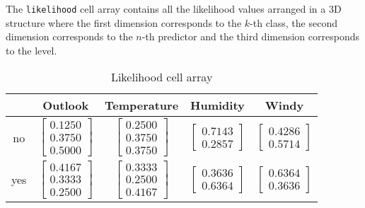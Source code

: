 The \texttt{likelihood} cell array contains all the likelihood values arranged in a 3D structure where the first dimension corresponds to the $k$-th class, the second dimension corresponds to the $n$-th predictor and the third dimension corresponds to the level.
\begin{table}[]
	\renewcommand{\arraystretch}{1.3}
	\caption{Likelihood cell array}
	\label{tbl:cond_probs_array}
	\centering
	\begin{tabular}{|c||c|c|c|c|}
		\hline
		& Outlook  & Temperature & Humidity & Windy \\ \hline \hline
		no  & $\begin{bmatrix} 0.1250 \\ 0.3750 \\ 0.5000 \end{bmatrix}$ &  
		      $\begin{bmatrix} 0.2500 \\ 0.3750 \\ 0.3750 \end{bmatrix}$ & 
		      $\begin{bmatrix} 0.7143 \\ 0.2857 \end{bmatrix}$ &  
		      $\begin{bmatrix} 0.4286 \\ 0.5714 \end{bmatrix}$ \\ \hline
		yes & $\begin{bmatrix} 0.4167 \\ 0.3333 \\ 0.2500 \end{bmatrix}$ &  
			  $\begin{bmatrix} 0.3333 \\ 0.2500 \\ 0.4167 \end{bmatrix}$ & 
			  $\begin{bmatrix} 0.3636 \\ 0.6364 \end{bmatrix}$ &  
			  $\begin{bmatrix} 0.6364 \\ 0.3636 \end{bmatrix}$ \\ \hline
	\end{tabular}
\end{table}

